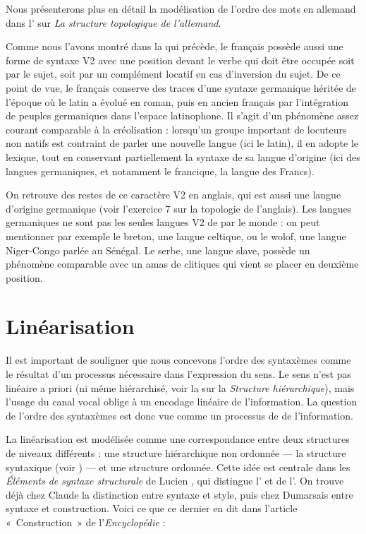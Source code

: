 {Nous présenterons plus en détail la modélisation de l'ordre des mots en allemand dans l' sur \textit{La structure topologique de l'allemand}.

    Comme nous l’avons montré dans la  qui précède, le français possède aussi une forme de syntaxe V2 avec une position devant le verbe qui doit être occupée soit par le sujet, soit par un complément locatif en cas d’inversion du sujet. De ce point de vue, le français conserve des traces d’une syntaxe germanique héritée de l’époque où le latin a évolué en roman, puis en ancien français par l’intégration de peuples germaniques dans l’espace latinophone. Il s’agit d’un phénomène assez courant comparable à la créolisation : lorsqu’un groupe important de locuteurs non natifs est contraint de parler une nouvelle langue (ici le latin), il en adopte le lexique, tout en conservant partiellement la syntaxe de sa langue d’origine (ici des langues germaniques, et notamment le francique, la langue des Francs).

    On retrouve des restes de ce caractère V2 en anglais, qui est aussi une langue d’origine germanique (voir l’exercice 7 sur la topologie de l’anglais). Les langues germaniques ne sont pas les seules langues V2 de par le monde : on peut mentionner par exemple le breton, une langue celtique, ou le wolof, une langue Niger-Congo parlée au Sénégal. Le serbe, une langue slave, possède un phénomène comparable avec un amas de clitiques qui vient se placer en deuxième position.
}
\section{Linéarisation}\label{sec:3.5.6}

Il est important de souligner que nous concevons l’ordre des syntaxèmes comme le résultat d’un processus nécessaire dans l’expression du sens. Le sens n’est pas linéaire a priori (ni même hiérarchisé, voir la  sur la \textit{Structure hiérarchique}), mais l’usage du canal vocal oblige à un encodage linéaire de l’information. La question de l’ordre des syntaxèmes est donc vue comme un processus de  de l’information.

La linéarisation est modélisée comme une correspondance entre deux structures de niveaux différents : une structure hiérarchique non ordonnée — la structure syntaxique (voir ) — et une structure ordonnée. Cette idée est centrale dans les \textit{Éléments de syntaxe structurale} de Lucien \citet{tesniere1959elements}, qui distingue l’ et de l’. On trouve déjà chez Claude \citet{buffier1709grammaire} la distinction entre syntaxe et style, puis chez Dumarsais entre syntaxe et construction. Voici ce que ce dernier en dit dans l’article «~Construction~» de l’\textit{Encyclopédie} :

